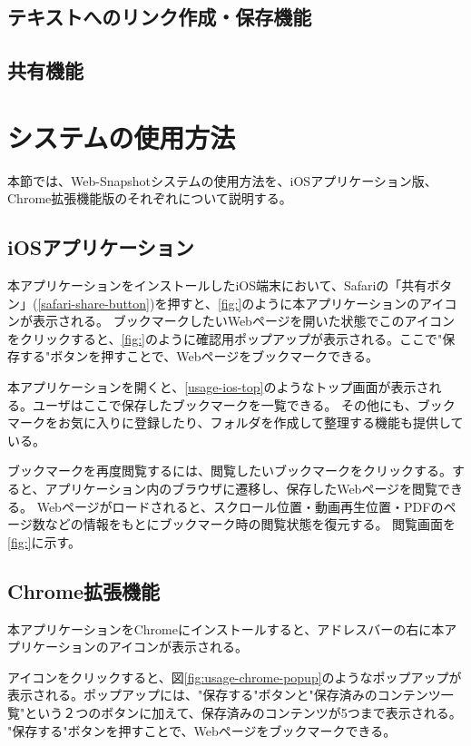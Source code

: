 \subsection{テキストへのリンク作成・保存機能}
\subsection{共有機能}

\section{システムの使用方法}
本節では、Web-Snapshotシステムの使用方法を、iOSアプリケーション版、Chrome拡張機能版のそれぞれについて説明する。

\subsection{iOSアプリケーション}
本アプリケーションをインストールしたiOS端末において、Safariの「共有ボタン」(\ref{safari-share-button})を押すと、\ref{fig:}のように本アプリケーションのアイコンが表示される。
ブックマークしたいWebページを開いた状態でこのアイコンをクリックすると、\ref{fig:}のように確認用ポップアップが表示される。ここで"保存する"ボタンを押すことで、Webページをブックマークできる。

本アプリケーションを開くと、\ref{usage-ios-top}のようなトップ画面が表示される。ユーザはここで保存したブックマークを一覧できる。
その他にも、ブックマークをお気に入りに登録したり、フォルダを作成して整理する機能も提供している。

ブックマークを再度閲覧するには、閲覧したいブックマークをクリックする。すると、アプリケーション内のブラウザに遷移し、保存したWebページを閲覧できる。
Webページがロードされると、スクロール位置・動画再生位置・PDFのページ数などの情報をもとにブックマーク時の閲覧状態を復元する。
閲覧画面を\ref{fig:}に示す。

\subsection{Chrome拡張機能}
本アプリケーションをChromeにインストールすると、アドレスバーの右に本アプリケーションのアイコンが表示される。

アイコンをクリックすると、図\ref{fig:usage-chrome-popup}のようなポップアップが表示される。ポップアップには、"保存する"ボタンと"保存済みのコンテンツ一覧"という２つのボタンに加えて、保存済みのコンテンツが5つまで表示される。
"保存する"ボタンを押すことで、Webページをブックマークできる。

